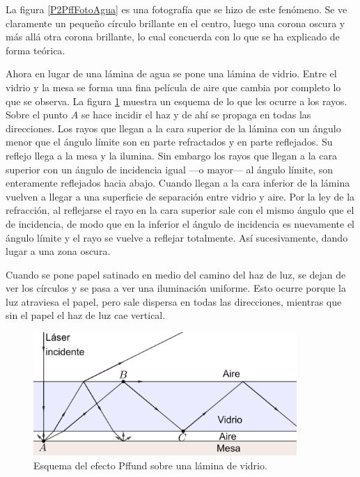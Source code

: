 \documentclass[12pt]{article}
\numberwithin{table}{section}
\numberwithin{figure}{section}
\numberwithin{equation}{section}
\begin{document}
La figura \ref{P2PffFotoAgua} es una fotografía que se hizo de este fenómeno. Se ve claramente un pequeño círculo brillante en el centro, luego una corona oscura y más allá otra corona brillante, lo cual concuerda con lo que se ha explicado de forma teórica.

Ahora en lugar de una lámina de agua se pone una lámina de vidrio. Entre el vidrio y la mesa se forma una fina película de aire que cambia por completo lo que se observa. La figura \ref{P2PffVidrio} muestra un esquema de lo que les ocurre a los rayos. Sobre el punto $A$ se hace incidir el haz y de ahí se propaga en todas las direcciones. Los rayos que llegan a la cara superior de la lámina con un ángulo menor que el ángulo límite son en parte refractados y en parte reflejados. Su reflejo llega a la mesa y la ilumina. Sin embargo los rayos que llegan a la cara superior con un ángulo de incidencia igual ---o mayor--- al ángulo límite, son enteramente reflejados hacia abajo. Cuando llegan a la cara inferior de la lámina vuelven a llegar a una superficie de separación entre vidrio y aire. Por la ley de la refracción, al reflejarse el rayo en la cara superior sale con el mismo ángulo que el de incidencia, de modo que en la inferior el ángulo de incidencia es nuevamente el ángulo límite y el rayo se vuelve a reflejar totalmente. Así sucesivamente, dando lugar a una zona oscura.

Cuando se pone papel satinado en medio del camino del haz de luz, se dejan de ver los círculos y se pasa a ver una iluminación uniforme. Esto ocurre porque la luz atraviesa el papel, pero sale dispersa en todas las direcciones, mientras que sin el papel el haz de luz cae vertical.

\begin{figure}[!ht]
	\small \centering \sffamily
	\begin{center}
		\includegraphics[width=10cm]{P2PffVidrio.png}
		\caption{Esquema del efecto Pffund sobre una lámina de vidrio.}
		\label{P2PffVidrio}
	\end{center}
\end{figure}
\end{document}
